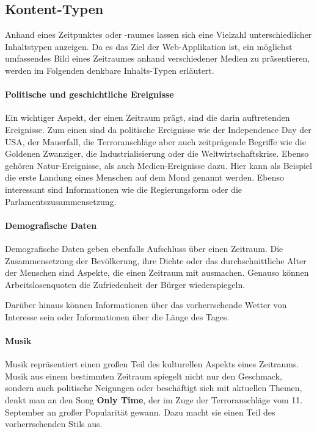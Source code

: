 \subsection{Kontent-Typen}
Anhand eines Zeitpunktes oder -raumes lassen sich eine Vielzahl unterschiedlicher Inhaltstypen anzeigen. Da es das Ziel der Web-Applikation ist, ein möglichst umfassendes Bild eines Zeitraumes anhand verschiedener Medien zu präsentieren, werden im Folgenden denkbare Inhalts-Typen erläutert.

\paragraph{Politische und geschichtliche Ereignisse}
Ein wichtiger Aspekt, der einen Zeitraum prägt, sind die darin auftretenden Ereignisse. Zum einen sind da politische Ereignisse wie \zB der Independence Day der USA, der Mauerfall, die Terroranschläge aber auch zeitprägende Begriffe wie die Goldenen Zwanziger, die Industrialisierung oder die Weltwirtschaftskrise. Ebenso gehören Natur-Ereignisse, als auch Medien-Ereignisse dazu. Hier kann als Beispiel die erste Landung eines Menschen auf dem Mond genannt werden. Ebenso interessant sind Informationen wie die Regierungsform oder die Parlamentszusammensetzung.

\paragraph{Demografische Daten}
Demografische Daten geben ebenfalls Aufschluss über einen Zeitraum. Die Zusammensetzung der Bevölkerung, ihre Dichte oder \zB das durchschnittliche Alter der Menschen sind Aspekte, die einen Zeitraum mit ausmachen. Genauso können Arbeitslosenquoten die Zufriedenheit der Bürger wiederspiegeln.

Darüber hinaus können Informationen über das vorherrschende Wetter von Interesse sein oder Informationen über die Länge des Tages.

\paragraph{Musik}
Musik repräsentiert einen großen Teil des kulturellen Aspekts eines Zeitraums. Musik aus einem bestimmten Zeitraum spiegelt nicht nur den Geschmack, sondern auch politische Neigungen oder beschäftigt sich mit aktuellen Themen, denkt man an den Song \textbf{Only Time}, der im Zuge der Terroranschläge vom 11. September an großer Popularität gewann. Dazu macht sie einen Teil des vorherrschenden Stils aus.

